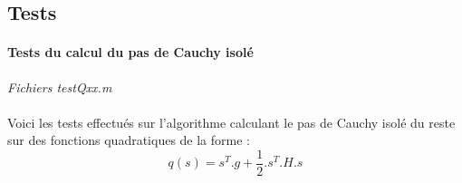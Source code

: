 \documentclass[12pt]{article}	%
\begin{document}
\subsection{Tests}
\paragraph{Tests du calcul du pas de Cauchy isolé}
\begin{flushright}
\textit{Fichiers testQxx.m}
\end{flushright}
\paragraph{}
Voici les tests effectués sur l'algorithme calculant le pas de Cauchy isolé du reste sur des fonctions quadratiques de la forme :
	\[q(s) = s^T.g + \frac{1}{2}.s^T.H.s\]
\end{document}
